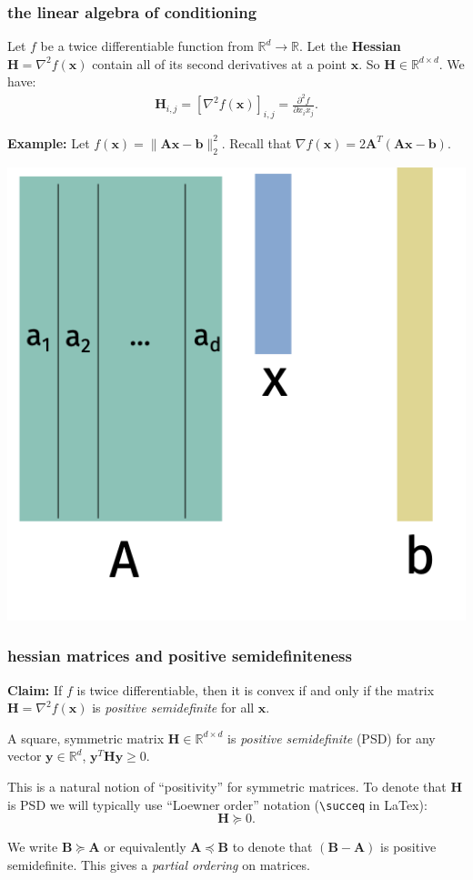 \documentclass[compress]{beamer}
\newcommand{\bv}[1]{\mathbf{#1}}
\newcommand{\R}{\mathbb{R}}
\begin{document}
\begin{frame}[t]
	\frametitle{the linear algebra of conditioning}
	Let $f$ be a twice differentiable function from $\R^d \rightarrow \R$. Let the \textbf{\alert{Hessian}} $\bv{H} = \nabla^2 f(\bv{x})$ contain all of its second derivatives at a point $\bv{x}$. So $\bv{H}\in \R^{d\times d}$.  We have:
	\begin{align*}
		\bv{H}_{i,j} = \left[\nabla^2 f(\bv{x})\right]_{i,j} = \frac{\partial^2 f}{\partial x_i x_j}. 
	\end{align*}
	
	\textbf{Example:}
	Let $f(\bv{x}) = \|\bv{A}\bv{x} - \bv{b}\|_2^2$. Recall that $\nabla f(\bv{x}) = 2\bv{A}^T(\bv{A}\bv{x}-\bv{b}).$
	
	\includegraphics[width=.4\textwidth]{regression.png}
\end{frame}

\begin{frame}[t]
	\frametitle{hessian matrices and positive semidefiniteness}
	\textbf{Claim:} If $f$ is twice differentiable, then it is convex if and only if the matrix $\bv{H} = \nabla^2 f(\bv{x})$ is \emph{positive semidefinite} for all $\bv{x}$. 
	
	\begin{definition}
		A square, symmetric matrix $\bv{H}\in \R^{d\times d}$ is \emph{positive semidefinite} (PSD) for any vector $\bv{y}\in \R^d$, $\bv{y}^T\bv{H}\bv{y} \geq 0$. 
	\end{definition}
	
	This is a natural notion of ``positivity'' for symmetric matrices. To denote that $\bv{H}$ is PSD we will typically use ``Loewner order'' notation (\texttt{\textbackslash succeq} in LaTex): $$\bv{H}\succeq 0.$$
	
	We write $\bv{B}\succeq \bv{A}$ or equivalently  $\bv{A}\preceq \bv{B}$ to denote that $(\bv{B} - \bv{A})$ is positive semidefinite. This gives a \emph{partial ordering} on matrices.
\end{frame}
\end{document}
